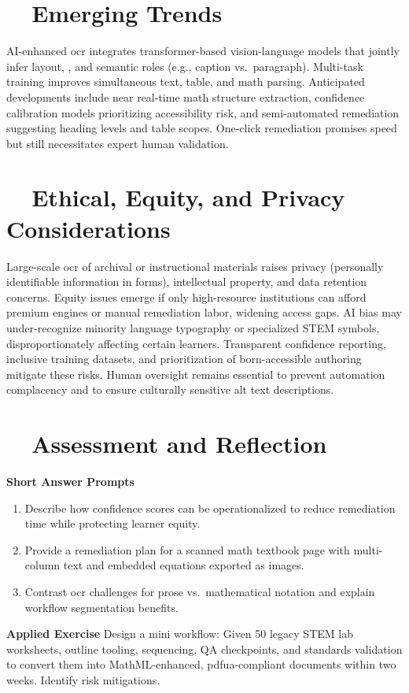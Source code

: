 \section{~~Emerging Trends}
\label{sec:ocr-emerging-trends}
AI-enhanced \gls{ocr} integrates transformer-based vision-language models that jointly infer layout, , and semantic roles (e.g., caption vs.\ paragraph). Multi-task training improves simultaneous text, table, and math parsing. Anticipated developments include near real-time math structure extraction, confidence calibration models prioritizing accessibility risk, and semi-automated remediation suggesting heading levels and table scopes. One-click remediation promises speed but still necessitates expert human validation.

\section{~~Ethical, Equity, and Privacy Considerations}
\label{sec:ocr-ethics}
Large-scale \gls{ocr} of archival or instructional materials raises privacy (personally identifiable information in forms), intellectual property, and data retention concerns. Equity issues emerge if only high-resource institutions can afford premium engines or manual remediation labor, widening access gaps. AI bias may under-recognize minority language typography or specialized STEM symbols, disproportionately affecting certain learners. Transparent confidence reporting, inclusive training datasets, and prioritization of born-accessible authoring mitigate these risks. Human oversight remains essential to prevent automation complacency and to ensure culturally sensitive alt text descriptions.

\section{~~Assessment and Reflection}
\label{sec:ocr-assessment}
\textbf{Short Answer Prompts}
\begin{enumerate}
	\item Describe how confidence scores can be operationalized to reduce remediation time while protecting learner equity.
	\item Provide a remediation plan for a scanned math textbook page with multi-column text and embedded equations exported as images.
	\item Contrast \gls{ocr} challenges for prose vs.\ mathematical notation and explain workflow segmentation benefits.
\end{enumerate}
\textbf{Applied Exercise} Design a mini workflow: Given 50 legacy STEM lab worksheets, outline tooling, sequencing, QA checkpoints, and standards validation to convert them into MathML-enhanced, \gls{pdfua}-compliant documents within two weeks. Identify risk mitigations.


